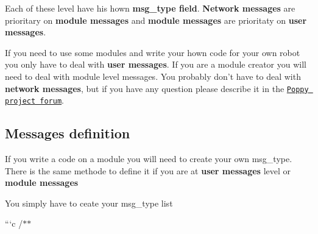 Each of these level have his hown {\bfseries msg\-\_\-type field}. {\bfseries Network messages} are prioritary on {\bfseries module messages} and {\bfseries module messages} are prioritaty on {\bfseries user messages}.

If you need to use some modules and write your hown code for your own robot you only have to deal with {\bfseries user messages}. If you are a module creator you will need to deal with module level messages. You probably don't have to deal with {\bfseries network messages}, but if you have any question please describe it in the \href{https://forum.poppy-project.org}{\tt Poppy project forum}.

\subsection*{Messages definition }

If you write a code on a module you will need to create your own msg\-\_\-type. There is the same methode to define it if you are at {\bfseries user messages} level or {\bfseries module messages}

You simply have to ceate your msg\-\_\-type list

```c /$\ast$$\ast$
\begin{DoxyItemize}
\item 
\end{DoxyItemize}